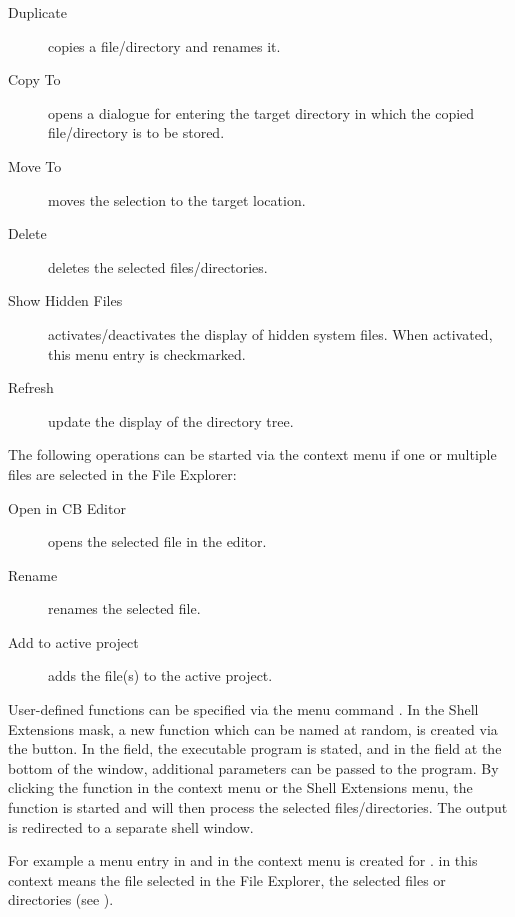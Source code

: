 \begin{description}
\item[Duplicate] copies a file/directory and renames it.
\item[Copy To] opens a dialogue for entering the target directory in which the copied file/directory is to be stored.
\item[Move To] moves the selection to the target location.
\item[Delete] deletes the selected files/directories.
\item[Show Hidden Files] activates/deactivates the display of hidden system files. When activated, this menu entry is checkmarked.
\item[Refresh] update the display of the directory tree.
\end{description}

The following operations can be started via the context menu if one or multiple files are selected in the File Explorer:

\begin{description}
\item[Open in CB Editor] opens the selected file in the \codeblocks editor.
\item[Rename] renames the selected file.
\item[Add to active project] adds the file(s) to the active project.
\end{description}


User-defined functions can be specified via the menu command . In the Shell Extensions mask, a new function which can be named at random, is created via the  button. In the  field, the executable program is stated, and in the field at the bottom of the window, additional parameters can be passed to the program.
By clicking the function in the context menu or the Shell Extensions menu, the function is started and will then process the selected files/directories. The output is redirected to a separate shell window.

For example a menu entry in  and in the context menu is created for .  in this context means the file selected in the File Explorer,  the selected files or directories (see ).

